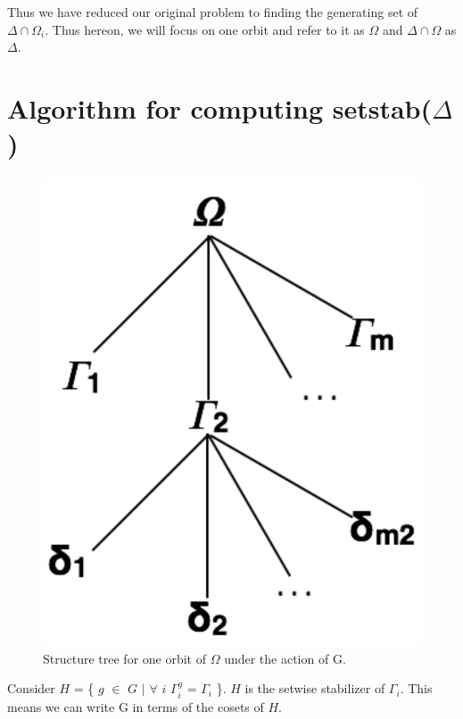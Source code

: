 Thus we have reduced our original problem to finding the generating set of $\Delta\cap\Omega_{i}$. Thus hereon, we will focus on one orbit and refer to it as $\Omega$ and $\Delta\cap\Omega$ as $\Delta$.

\section{Algorithm for computing setstab($\Delta$)}

\begin{figure}[htp!]
	\centering
	\includegraphics[scale=0.3]{images/setstabalg.pdf}
	\caption{Structure tree for one orbit of $\Omega$ under the action of G.}
	\label{fig:structurestree}
\end{figure}

Consider $H$ = \{ $g$ $\in$ $G$ $|$ $\forall$ $i$ $\Gamma_{i}^{g}$ = $\Gamma_{i}$ \}. $H$ is the setwise stabilizer of $\Gamma_{i}$. This means we can write G in terms of the cosets of $H$. 


